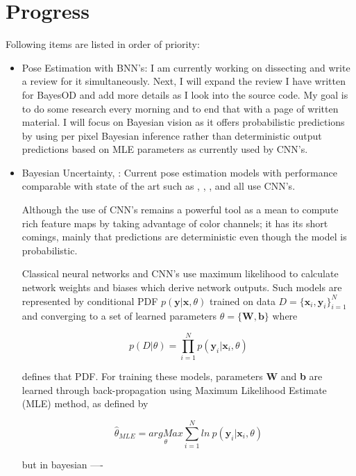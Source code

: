 \documentclass[11pt]{article}
\begin{document}
\section{Progress}
Following items are listed in order of priority:
\begin{itemize}
	\item Pose Estimation with BNN's: I am currently working on dissecting 
	\cite{kendall2017uncertainties} and write a review for it simultaneously. 
	Next, I will expand the review I have written for BayesOD and add more 
	details as I look into the source code. My goal is to do some research every
	morning and to end that with a page of written material. I will focus on 
	Bayesian vision as it offers probabilistic predictions by using per pixel
	Bayesian inference rather than deterministic output predictions based on MLE
	 parameters as currently used by CNN's. 
	
	
	\item Bayesian Uncertainty, \cite{kendall2017uncertainties}: Current pose 
	estimation models with performance comparable with state of the art such as 
	\cite{posecnn}, \cite{Dope}, \cite{MoreFusion}, and \cite{DenseFusion} all 
	use CNN's. 
	
	Although the use of CNN's remains a powerful tool as a mean to compute rich 
	feature maps by taking advantage of color channels; it has its short 
	comings, mainly that predictions are deterministic even though the model 
	is probabilistic. 
	
	Classical neural networks and CNN's use maximum likelihood to calculate 
	network weights and biases which derive network outputs. Such models are 
	represented by conditional PDF \( p(\textbf{y} | \textbf{x}, \theta) \) 
	trained on data \( D = \{ \textbf{x}_{i},\textbf{y}_{i} \}_{i = 1}^{N} \) 
	and converging to a set of learned parameters 
	\( \theta = \{ \textbf{W}, \textbf{b} \}\) where

	$$ p(D| \theta) = \prod_{i = 1}^{N}  p(\textbf{y}_{i} |\textbf{x}_{i}, \theta)  $$
	
	defines that PDF. For training these models, parameters \textbf{W} and 
	\textbf{b} are learned through back-propagation using Maximum Likelihood 
	Estimate (MLE) method, as defined by  
	
	$$ \hat{\theta}_{MLE} = \underset{\theta}{argMax} \sum_{i = 1}^{N} ln ~p(\textbf{y}_{i} | \textbf{x}_{i}, \theta) $$
	
	

	but in bayesian ---- 
	

\end{itemize}
\end{document}
